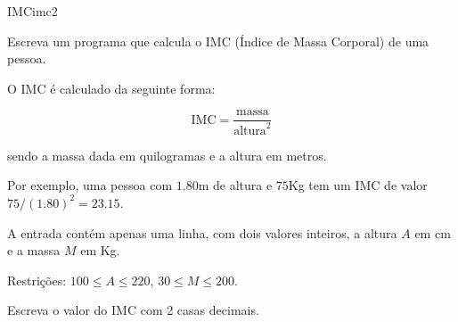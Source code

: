 \documentclass[12pt,a4paper,oneside]{article}
\begin{document}
\begin{problem}{IMC}{imc}{2}

\begingroup
\setlength{\intextsep}{0pt}%


Escreva um programa que calcula o IMC (Índice de Massa Corporal) de uma pessoa.

O IMC é calculado da seguinte forma:

$$\text{IMC} = \frac{\text{massa}}{\text{altura}^2}$$

sendo a massa dada em quilogramas e a altura em metros.

Por exemplo, uma pessoa com $1.80$m de altura e $75$Kg tem um IMC de valor $75/(1.80)^2 = 23.15$.


\InputFile

A entrada contém apenas uma linha, com dois valores inteiros, a altura $A$ em cm e a massa $M$ em Kg.

Restrições: $100 \leq A \leq 220$, $30 \leq M \leq 200$.

\endgroup

\OutputFile

Escreva o valor do IMC com 2 casas decimais.


\Example

\begin{example}
%
\end{example}

\begin{example}
%
\end{example}

\begin{example}
%
\end{example}


\end{problem}
\end{document}
